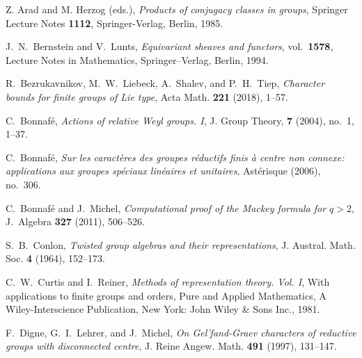 \documentclass[eqthmnum,nocolour,skinny]{jt-calcs}
\begin{document}
\begin{thebibliography}{99}


{\sc  Z. Arad and M. Herzog (eds.)},
  {\it Products of conjugacy classes in groups},
  Springer Lecture Notes {\bf 1112}, Springer-Verlag, Berlin, 1985.

{\sc J.~N.~Bernstein and V.~Lunts}, \emph{Equivariant sheaves and functors}, vol.~{\bf 1578}, Lecture Notes in Mathematics, Springer--Verlag, Berlin, 1994.

{\sc R.~Bezrukavnikov, M.~W.~Liebeck, A.~Shalev, and P.~H.~Tiep}, \emph{Character bounds for finite groups of Lie type}, Acta Math. 
{\bf 221} (2018), 1--57.

{\sc C.~Bonnaf\'e}, \emph{Actions of relative Weyl groups. I}, J. Group Theory, {\bf 7} (2004), no.~1, 1--37.

{\sc C.~Bonnaf\'e}, \emph{Sur les caract\`eres des groupes r\'eductifs finis \`a centre non connexe: applications aux groupes sp\'eciaux lin\'eaires et unitaires}, Ast\'erisque (2006), no.~306.

{\sc C.~Bonnaf\'e and J.~Michel}, \emph{Computational proof of the Mackey formula for $q > 2$}, J.~Algebra {\bf 327} (2011), 506--526.

{\sc S.~B.~Conlon}, \emph{Twisted group algebras and their representations}, J. Austral. Math. Soc. {\bf 4} (1964), 152--173.

{\sc C.~W.~Curtis and I.~Reiner}, \emph{Methods of representation theory. Vol. I}, With applications to finite groups and orders, Pure and Applied Mathematics, A Wiley-Interscience Publication, New York: John Wiley \& Sons Inc., 1981.

{\sc F.~Digne, G.~I.~Lehrer, and J.~Michel}, \emph{On {G}el'fand-{G}raev characters of reductive groups with disconnected centre}, J. Reine Angew. Math. {\bf 491} (1997), 131--147.


\end{thebibliography}
\end{document}
